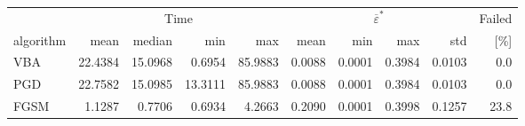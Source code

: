\small
\setlength{\tabcolsep}{3pt}
\begin{tabular}{lrrrrrrrrr}
\toprule
 & \multicolumn{4}{c}{Time} & \multicolumn{4}{c}{$\overline{\varepsilon}^*$} & Failed \\
  \cmidrule(lr){2-5}\cmidrule(lr){6-9}
algorithm & mean & median & min & max & mean & min & max & std & [\%] \\
\midrule
VBA & 22.4384 & 15.0968 & 0.6954 & 85.9883 & 0.0088 & 0.0001 & 0.3984 & 0.0103 & 0.0 \\
PGD & 22.7582 & 15.0985 & 13.3111 & 85.9883 & 0.0088 & 0.0001 & 0.3984 & 0.0103 & 0.0 \\
FGSM & 1.1287 & 0.7706 & 0.6934 & 4.2663 & 0.2090 & 0.0001 & 0.3998 & 0.1257 & 23.8 \\
\bottomrule
\end{tabular}

